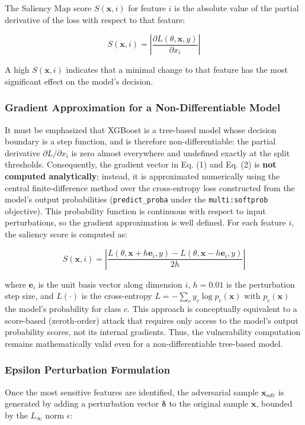 \documentclass[11pt, a4paper]{article}
\begin{document}
The Saliency Map score $S(\mathbf{x}, i)$ for feature $i$ is the absolute value of the partial derivative of the loss with respect to that feature:

\begin{equation}
S(\mathbf{x}, i) = \left| \frac{\partial L(\theta, \mathbf{x}, y)}{\partial x_i} \right|
\end{equation}

A high $S(\mathbf{x}, i)$ indicates that a minimal change to that feature has the most significant effect on the model's decision.

\subsubsection{Gradient Approximation for a Non-Differentiable Model}
It must be emphasized that XGBoost is a tree-based model whose decision boundary is a step function, and is therefore non-differentiable: the partial derivative $\partial L / \partial x_i$ is zero almost everywhere and undefined exactly at the split thresholds. Consequently, the gradient vector in Eq. (1) and Eq. (2) is \textbf{not computed analytically}; instead, it is approximated numerically using the central finite-difference method over the cross-entropy loss constructed from the model's output probabilities (\texttt{predict\_proba} under the \texttt{multi:softprob} objective). This probability function is continuous with respect to input perturbations, so the gradient approximation is well defined. For each feature $i$, the saliency score is computed as:

\begin{equation}
S(\mathbf{x}, i) = \left| \frac{L(\theta, \mathbf{x} + h\mathbf{e}_i, y) - L(\theta, \mathbf{x} - h\mathbf{e}_i, y)}{2h} \right|
\end{equation}

where $\mathbf{e}_i$ is the unit basis vector along dimension $i$, $h = 0.01$ is the perturbation step size, and $L(\cdot)$ is the cross-entropy $L = -\sum_{c} y_c \log p_c(\mathbf{x})$ with $p_c(\mathbf{x})$ the model's probability for class $c$. This approach is conceptually equivalent to a score-based (zeroth-order) attack that requires only access to the model's output probability scores, not its internal gradients. Thus, the vulnerability computation remains mathematically valid even for a non-differentiable tree-based model.

\subsubsection{Epsilon Perturbation Formulation}
Once the most sensitive features are identified, the adversarial sample $\mathbf{x}_{adv}$ is generated by adding a perturbation vector $\boldsymbol{\delta}$ to the original sample $\mathbf{x}$, bounded by the $L_\infty$ norm $\epsilon$:
\end{document}
